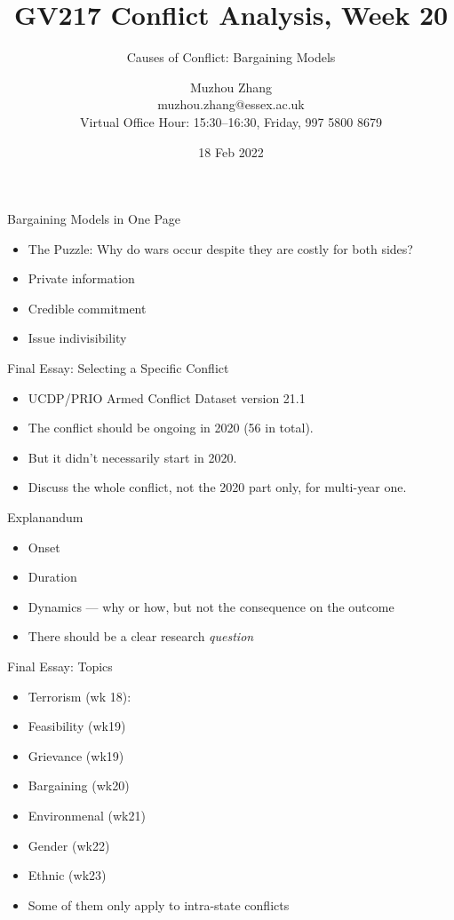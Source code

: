 \documentclass{beamer}
\title{GV217 Conflict Analysis, Week 20}
\subtitle{Causes of Conflict: Bargaining Models}
\author{Muzhou Zhang\\ muzhou.zhang@essex.ac.uk\\ Virtual Office Hour: 15:30--16:30, Friday, 997 5800 8679}
\date{18 Feb 2022}
\begin{document}
\maketitle
{}

\begin{frame}{Bargaining Models in One Page}
    \begin{itemize}
        \pause\item The Puzzle: Why do wars occur despite they are costly for both sides?
        \pause\item Private information
        \pause\item Credible commitment
        \pause\item Issue indivisibility
    \end{itemize}
\end{frame}

\begin{frame}{Final Essay: Selecting a Specific Conflict}
    \begin{itemize}
        \pause\item UCDP/PRIO Armed Conflict Dataset version 21.1
        \pause\item The conflict should be ongoing in 2020 (56 in total).
        \pause\item But it didn't necessarily start in 2020.
        \pause\item Discuss the whole conflict, not the 2020 part only, for multi-year one. 
    \end{itemize}
\end{frame}

\begin{frame}{Explanandum}
    \begin{itemize}
        \pause\item Onset
        \pause\item Duration
        \pause\item Dynamics --- why or how, but not the consequence on the outcome
        \pause\item There should be a clear research \emph{question}
    \end{itemize}
\end{frame}

\begin{frame}{Final Essay: Topics}
    \begin{itemize}
        \pause\item Terrorism (wk 18): 
        \pause\item Feasibility (wk19)
        \pause\item Grievance (wk19)
        \pause\item Bargaining (wk20)
        \pause\item Environmenal (wk21)
        \pause\item Gender (wk22)
        \pause\item Ethnic (wk23)
        \pause\item Some of them only apply to intra-state conflicts
    \end{itemize}
\end{frame}
\end{document}
